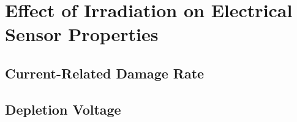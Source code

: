 \section{Effect of Irradiation on Electrical Sensor Properties}
\label{sec:irradiation}

\subsection{Current-Related Damage Rate}
\label{subsec:irradiation_alpha}

\subsection{Depletion Voltage}
\label{subsec:irradiation_Vdep}
